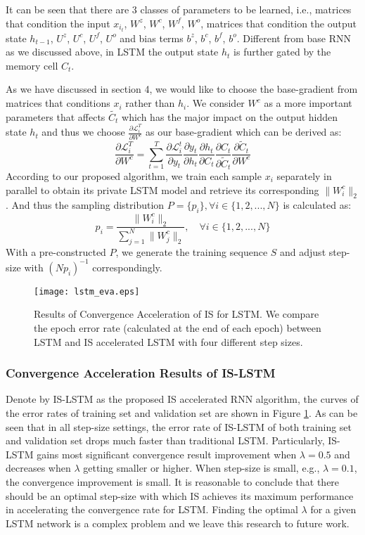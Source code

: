 \documentclass[twoside,leqno,twocolumn]{article}
\begin{document}
It can be seen that there are 3 classes of parameters to be learned, i.e., matrices that condition the input $x_{i_t}$, $W^z$, $W^c$, $W^f$, $W^o$, matrices that condition the output state $h_{t-1}$, $U^z$, $U^c$, $U^f$, $U^o$ and bias terms $b^z$, $b^c$, $b^f$, $b^o$. Different from base RNN as we discussed above, in LSTM the output state $h_t$ is further gated by the memory cell $C_t$. 

As we have discussed in section 4, we would like to choose the base-gradient from matrices that conditions $x_i$ rather than $h_i$. We consider $W^c$ as a more important parameters that affects $\tilde{C_t}$ which has the major impact on the output hidden state $h_t$ and thus we choose $\frac{\partial \mathcal{L}_i^T}{\partial W^{c}}$ as our base-gradient which can be derived as:
\begin{equation}
\frac{\partial \mathcal{L}_i^T}{\partial W^{c}}=\sum_{t=1}^{T}\frac{\partial \mathcal{L}_i^t}{\partial y_{t}}\frac{\partial y_t}{\partial h_{t}}\frac{\partial h_t}{\partial C_{t}}\frac{\partial C_t}{\partial \tilde C_{t}}\frac{\partial \tilde C_t}{\partial W^{c}}
\end{equation}
According to our proposed algorithm, we train each sample $x_i$ separately in parallel to obtain its private LSTM model and retrieve its corresponding $\|W_{i}^{c}\|_2$. And thus the sampling distribution $P=\{p_i\}, \forall i\in \{1,2,...,N\}$ is calculated as:
\begin{equation}
	p_i=\frac{\|W_{i}^c\|_2}{\sum_{j=1}^{N}\|W_{j}^c\|_2}, \quad \forall i \in \{1,2,...,N\}
\end{equation}
With a pre-constructed $P$, we generate the training sequence $S$ and adjust step-size with $(Np_i)^{-1}$ correspondingly. 
\begin{figure}[t]
	\centering
	\texttt{[image: lstm\_eva.eps]}
	\caption{Results of Convergence Acceleration of IS for LSTM. We compare the epoch error rate (calculated at the end of each epoch) between LSTM and IS accelerated LSTM with four different step sizes.}
	\label{lstm_eval}
\end{figure}
\subsubsection{Convergence Acceleration Results of IS-LSTM}
Denote by IS-LSTM as the proposed IS accelerated RNN algorithm, the curves of the error rates of training set and validation set are shown in Figure \ref{lstm_eval}. As can be seen that in all step-size settings, the error rate of IS-LSTM of both training set and validation set drops much faster than traditional LSTM. Particularly, IS-LSTM gains most significant convergence result improvement when $\lambda=0.5$ and decreases when $\lambda$ getting smaller or higher. When step-size is small, e.g., $\lambda=0.1$, the convergence improvement is small. It is reasonable to conclude that there should be an optimal step-size with which IS achieves its maximum performance in accelerating the convergence rate for LSTM. Finding the optimal $\lambda$ for a given LSTM network is a complex problem and we leave this research to future work.
\end{document}
